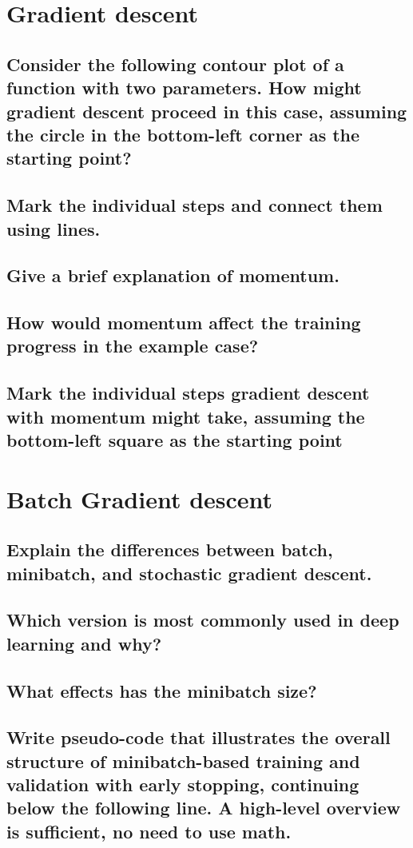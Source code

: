 \section{Gradient descent}
\subsection{Consider the following contour plot of a function with two parameters. How might gradient descent proceed in this case, assuming the circle in the bottom-left corner as the starting point?}
\subsection{Mark the individual steps and connect them using lines.}
\subsection{Give a brief explanation of momentum.}
\subsection{How would momentum affect the training progress in the example case?}
\subsection{Mark the individual steps gradient descent with momentum might take, assuming the bottom-left square as the starting point}

\section{Batch Gradient descent}
\subsection{Explain the differences between batch, minibatch, and stochastic gradient descent.}
\subsection{Which version is most commonly used in deep learning and why?}
\subsection{What effects has the minibatch size?}
\subsection{Write pseudo-code that illustrates the overall structure of minibatch-based training and validation with early stopping, continuing below the following line. A high-level overview is sufficient, no need to use math.}

